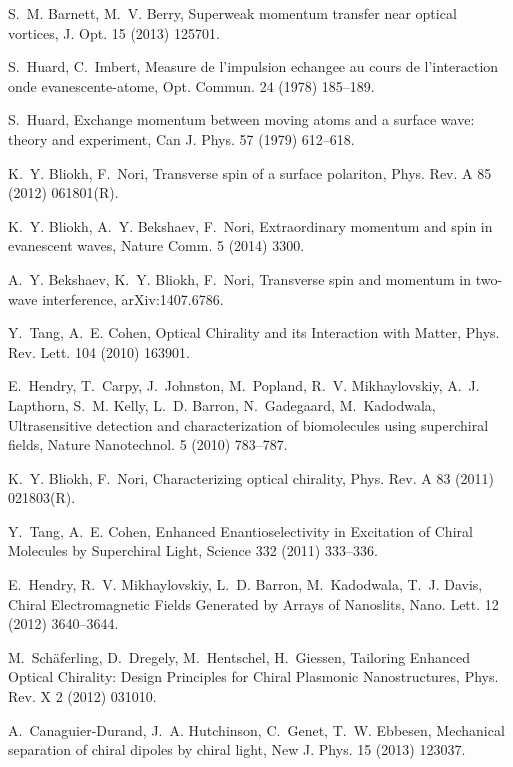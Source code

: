 \documentclass[1p,sort&compress]{elsarticle}
\numberwithin{equation}{section}
\begin{document}
\begin{thebibliography}{999}
S.~M. Barnett, M.~V. Berry, {Superweak momentum transfer near optical
  vortices}, J. Opt. 15 (2013) 125701.

S.~Huard, C.~Imbert, {Measure de l'impulsion echangee au cours de l'interaction
  onde evanescente-atome}, Opt. Commun. 24 (1978) 185--189.

S.~Huard, {Exchange momentum between moving atoms and a surface wave: theory
  and experiment}, Can J. Phys. 57 (1979) 612--618.

K.~Y. Bliokh, F.~Nori, {Transverse spin of a surface polariton}, Phys. Rev. A
  85 (2012) 061801(R).

K.~Y. Bliokh, A.~Y. Bekshaev, F.~Nori, {Extraordinary momentum and spin in
  evanescent waves}, Nature Comm. 5 (2014) 3300.

A.~Y. Bekshaev, K.~Y. Bliokh, F.~Nori, {Transverse spin and momentum in
  two-wave interference}, arXiv:1407.6786.

Y.~Tang, A.~E. Cohen, {Optical Chirality and its Interaction with Matter},
  Phys. Rev. Lett. 104 (2010) 163901.

E.~Hendry, T.~Carpy, J.~Johnston, M.~Popland, R.~V. Mikhaylovskiy, A.~J.
  Lapthorn, S.~M. Kelly, L.~D. Barron, N.~Gadegaard, M.~Kadodwala,
  {Ultrasensitive detection and characterization of biomolecules using
  superchiral fields}, Nature Nanotechnol. 5 (2010) 783--787.

K.~Y. Bliokh, F.~Nori, {Characterizing optical chirality}, Phys. Rev. A 83
  (2011) 021803(R).

Y.~Tang, A.~E. Cohen, {Enhanced Enantioselectivity in Excitation of Chiral
  Molecules by Superchiral Light}, Science 332 (2011) 333--336.

E.~Hendry, R.~V. Mikhaylovskiy, L.~D. Barron, M.~Kadodwala, T.~J. Davis,
  {Chiral Electromagnetic Fields Generated by Arrays of Nanoslits}, Nano. Lett.
  12 (2012) 3640--3644.

M.~Sch\"{a}ferling, D.~Dregely, M.~Hentschel, H.~Giessen, {Tailoring Enhanced
  Optical Chirality: Design Principles for Chiral Plasmonic Nanostructures},
  Phys. Rev. X 2 (2012) 031010.

A.~Canaguier-Durand, J.~A. Hutchinson, C.~Genet, T.~W. Ebbesen, {Mechanical
  separation of chiral dipoles by chiral light}, New J. Phys. 15 (2013) 123037.


\end{thebibliography}
\end{document}
